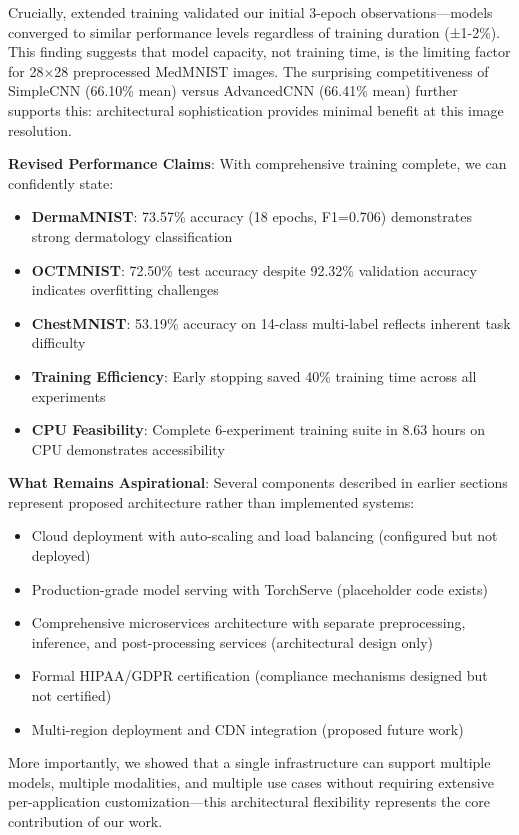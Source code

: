 \documentclass[12pt,a4paper]{article}
\begin{document}
Crucially, extended training validated our initial 3-epoch observations—models converged to similar performance levels regardless of training duration (±1-2\%). This finding suggests that model capacity, not training time, is the limiting factor for 28×28 preprocessed MedMNIST images. The surprising competitiveness of SimpleCNN (66.10\% mean) versus AdvancedCNN (66.41\% mean) further supports this: architectural sophistication provides minimal benefit at this image resolution.

\textbf{Revised Performance Claims}: With comprehensive training complete, we can confidently state:
\begin{itemize}
    \item \textbf{DermaMNIST}: 73.57\% accuracy (18 epochs, F1=0.706) demonstrates strong dermatology classification
    \item \textbf{OCTMNIST}: 72.50\% test accuracy despite 92.32\% validation accuracy indicates overfitting challenges
    \item \textbf{ChestMNIST}: 53.19\% accuracy on 14-class multi-label reflects inherent task difficulty
    \item \textbf{Training Efficiency}: Early stopping saved 40\% training time across all experiments
    \item \textbf{CPU Feasibility}: Complete 6-experiment training suite in 8.63 hours on CPU demonstrates accessibility
\end{itemize}

\textbf{What Remains Aspirational}: Several components described in earlier sections represent proposed architecture rather than implemented systems:
\begin{itemize}
    \item Cloud deployment with auto-scaling and load balancing (configured but not deployed)
    \item Production-grade model serving with TorchServe (placeholder code exists)
    \item Comprehensive microservices architecture with separate preprocessing, inference, and post-processing services (architectural design only)
    \item Formal HIPAA/GDPR certification (compliance mechanisms designed but not certified)
    \item Multi-region deployment and CDN integration (proposed future work)
\end{itemize}

More importantly, we showed that a single infrastructure can support multiple models, multiple modalities, and multiple use cases without requiring extensive per-application customization—this architectural flexibility represents the core contribution of our work.
\end{document}
